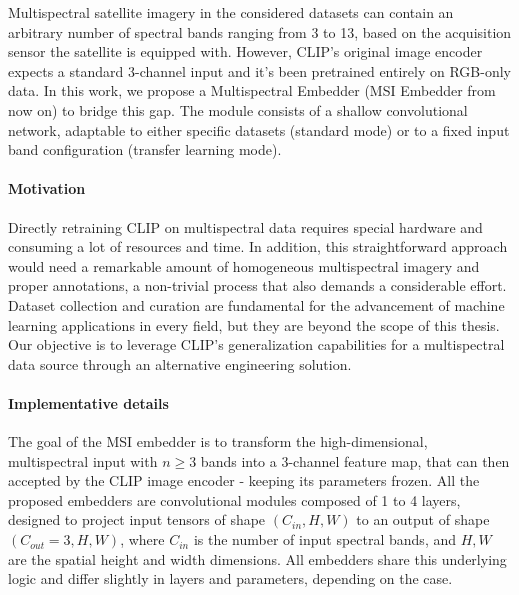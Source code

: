 \documentclass[a4paper, oneside, english]{sapthesis} %
\begin{document}
Multispectral satellite imagery in the considered datasets can contain an arbitrary number of spectral bands ranging from 3 to 13, based on the acquisition sensor the satellite is equipped with. However, CLIP’s original image encoder expects a standard 3-channel input and it's been pretrained entirely on RGB-only data. In this work, we propose a Multispectral Embedder (MSI Embedder from now on) to bridge this gap. The module consists of a shallow convolutional network, adaptable to either specific datasets (standard mode) or to a fixed input band configuration (transfer learning mode).

\paragraph{Motivation} Directly retraining CLIP on multispectral data requires special hardware and consuming a lot of resources and time. In addition, this straightforward approach would need a remarkable amount of homogeneous multispectral imagery and proper annotations, a non-trivial process that also demands a considerable effort. Dataset collection and curation are fundamental for the advancement of machine learning applications in every field, but they are beyond the scope of this thesis. Our objective is to leverage CLIP’s generalization capabilities for a multispectral data source through an alternative engineering solution.

\paragraph{Implementative details} The goal of the MSI embedder is to transform the high-dimensional, multispectral input with $n \ge 3$ bands into a $3$-channel feature map, that can then accepted by the CLIP image encoder - keeping its parameters frozen. 
All the proposed embedders are convolutional modules composed of 1 to 4 layers, designed to project input tensors of shape $(C_{in}, H, W)$ to an output of shape $(C_{out} = 3, H, W)$, where $C_{in}$ is the number of input spectral bands, and $H, W$ are the spatial height and width dimensions. All embedders share this underlying logic and differ slightly in layers and parameters, depending on the case.
\end{document}
